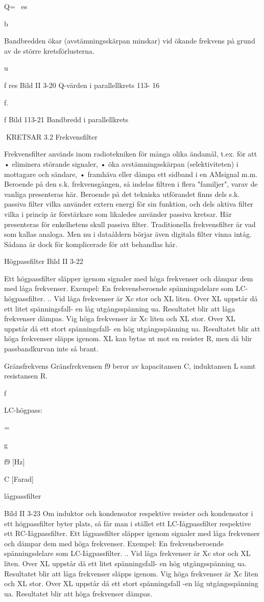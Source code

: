 {{Q= ~es

b

Bandbredden ökar (avstämningsskärpan
minskar) vid ökande frekvens på grund av de
större kretsförlusterna.

u

f res
Bild II 3-20 Q-värden i parallellkrets
113- 16

f.

f
Bild 113-21 Bandbredd i parallellkrets

KRETSAR
3.2 Frekvensfilter

Frekvensfilter används inom radiotekniken
för många olika ändamål, t.ex. för att
• eliminera störande signaler,
• öka avstämningsskärpan (selektiviteten) i
mottagare och sändare,
• framhäva eller dämpa ett sidband i en AMsignal m.m.
Beroende på den s.k. frekvensgången,
så indelas filtren i flera "familjer", varav de
vanliga presenteras här.
Beroende på det tekniska utförandet finns
dels s.k. passiva filter vilka använder extern
energi för sin funktion, och dels aktiva filter
vilka i princip är förstärkare som likaledes
använder passiva kretsar. Här presenteras
för enkelhetens skull passiva filter.
Traditionella frekvensfilter är vad som
kallas analoga. Men nu i dataåldern börjar
även digitala filter vinna intåg. Sådana är
dock för komplicerade för att behandlas här.

Högpassfilter
Bild II 3-22

Ett högpassfilter släpper igenom signaler
med höga frekvenser och dämpar dem med
låga frekvenser.
Exempel: En frekvensberoende spänningsdelare som LC-högpassfilter.
.. Vid låga frekvenser är Xc stor och XL liten.
Over XL uppstår då ett litet spänningsfall- en
låg utgångsspänning ua. Resultatet blir att
låga frekvenser dämpas.
Vig höga frekvenser är Xc liten och XL
stor. Over XL uppstår då ett stort spänningsfall- en hög utgångsspänning ua. Resultatet
blir att höga frekvenser släpps igenom.
XL kan bytas ut mot en resister R, men då
blir passbandkurvan inte så brant.

Gränsfrekvens
Gränsfrekvensen f9 beror av kapacitansen
C, induktansen L samt resistansen R.

f

LC-högpass:

=

g

f9 [Hz]

C [Farad]

lågpassfilter

Bild II 3-23
Om induktor och kondensator respektive
resister och kondensator i ett högpassfilter
byter plats, så får man i stället ett LC-Iågpassfilter respektive ett RC-Iågpassfilter.
Ett lågpassfilter släpper igenom signaler
med låga frekvenser och dämpar dem med
höga frekvenser.
Exempel: En frekvensberoende spänningsdelare som LC-Iågpassfilter.
.. Vid låga frekvenser är Xc stor och XL liten.
Over XL uppstår då ett litet spänningsfall- en
hög utgångsspänning ua. Resultatet blir att
låga frekvenser släpps igenom.
Vig höga frekvenser är Xc liten och XL
stor. Over XL uppstår då ett stort spänningsfall -en låg utgångsspänning ua. Resultatet
blir att höga frekvenser dämpas.

}}
